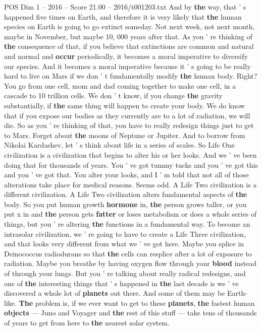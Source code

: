 \begin{textsample}{POS Dim 1 – 2016 – Score 21.00 – 2016/t001203.txt}
And by \textbf{the} way, that ' s happened five times on Earth, and therefore it is very likely that \textbf{the} human species on Earth is going to go extinct someday.
Not next week, not next month, maybe in November, but maybe 10, 000 years after that.
As you ' re thinking of \textbf{the} consequence of that, if you believe that extinctions are common and natural and normal and \textbf{occur} periodically, it becomes a moral imperative to diversify our species.
And it becomes a moral imperative because it ' s going to be really hard to live on Mars if we don ' t fundamentally modify \textbf{the} human body.
Right?
You go from one cell, mom and dad coming together to make one cell, in a cascade to 10 trillion cells.
We don ' t know, if you change \textbf{the} gravity substantially, if \textbf{the} same thing will happen to create your body.
We do know that if you expose our bodies as they currently are to a lot of radiation, we will die.
So as you ' re thinking of that, you have to really redesign things just to get to Mars.
Forget about \textbf{the} moons of Neptune or Jupiter.
And to borrow from Nikolai Kardashev, let ' s think about life in a series of scales.
So Life One civilization is a civilization that begins to alter his or her looks.
And we ' ve been doing that for thousands of years.
You ' ve got tummy tucks and you ' ve got this and you ' ve got that.
You alter your looks, and I ' m told that not all of those alterations take place for medical reasons.
Seems odd.
A Life Two civilization is a different civilization.
A Life Two civilization alters fundamental aspects of \textbf{the} body.
So you put human growth \textbf{hormone} in, \textbf{the} person grows taller, or you put x in and \textbf{the} person gets \textbf{fatter} or loses metabolism or does a whole series of things, but you ' re altering \textbf{the} functions in a fundamental way.
To become an intrasolar civilization, we ' re going to have to create a Life Three civilization, and that looks very different from what we ' ve got here.
Maybe you splice in Deinococcus radiodurans so that \textbf{the} cells can resplice after a lot of exposure to radiation.
Maybe you breathe by having oxygen flow through your \textbf{blood} instead of through your lungs.
But you ' re talking about really radical redesigns, and one of \textbf{the} interesting things that ' s happened in \textbf{the} last decade is we ' ve discovered a whole lot of \textbf{planets} out there.
And some of them may be Earth-like. \textbf{The} problem is, if we ever want to get to these \textbf{planets}, \textbf{the} fastest human \textbf{objects} — Juno and Voyager and \textbf{the} rest of this stuff — take tens of thousands of years to get from here to \textbf{the} nearest solar system.

\end{textsample}
